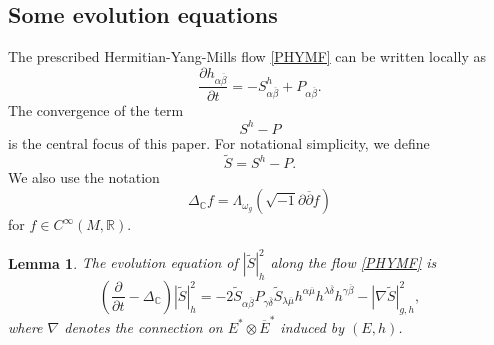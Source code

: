 \documentclass[12pt, reqno]{amsart}
\newcommand\bp{{\bar\partial}}
\theoremstyle{plain}
\newtheorem{lemma}[thm]{Lemma}
\theoremstyle{definition}
\newcommand{\elemma}{\end{lemma}}
\newcommand{\blemma}{\begin{lemma}}
\newcommand{\sq}{\sqrt{-1}}
\newcommand{\p}{\partial}
\renewcommand{\bar}{\overline}
\newcommand{\beq}{\begin{equation}}
\newcommand{\eeq}{\end{equation}}
\renewcommand{\tilde}{\widetilde}
\renewcommand{\bp}{\bar{\partial}}
\newcommand{\ts}{\otimes}
\renewcommand{\>}{\rightarrow}
\newcommand{\C}{{\mathbb C}}
\newcommand{\R}{{\mathbb R}}
\renewcommand{\>}{\rightarrow}
\renewcommand{\p}{{\partial}}
\renewcommand{\bp}{{\bar{\partial}}}
\renewcommand{\bar}{\overline}
\renewcommand{\tilde}{\widetilde}
\numberwithin{equation}{section} %
\begin{document}
\subsection{Some evolution equations} The prescribed Hermitian-Yang-Mills flow \eqref{PHYMF} can be written locally as
\beq
\frac{\p h_{\alpha\bar\beta}}{\p t} = -S^{h}_{\alpha\bar\beta}+P_{\alpha\bar\beta}.
\label{PHYM local lower index flow}
\eeq
The convergence of the term $$S^h-P$$ is the central focus of this paper. For notational simplicity, we define
\beq
\tilde S =S^h-P.
\eeq
We also use the notation
$$\Delta_{\C} f=\Lambda_{\omega_g}\left(\sq \p\bp f\right) $$  for $f\in C^\infty(M,\R)$.
\blemma\label{lem tilde S evolution}The evolution equation of $|\tilde S|^2_h$ along the flow \eqref{PHYMF} is
\beq
\left(\frac{\p }{\p t}-\Delta_\C \right)|\tilde S|_{h}^2
=-2\tilde S_{\alpha\bar\beta}  P_{\gamma\bar\delta}\tilde S_{\lambda\bar \mu} h^{\alpha\bar \mu}  h^{\lambda \bar \delta} h^{\gamma\bar\beta}
- \left|\nabla \tilde S\right|_{g,h}^2,
\label{tilde S evolution}
\eeq
where $\nabla$ denotes the connection on $E^*\ts \bar E^*$ induced by $(E,h)$.
\elemma
\end{document}
